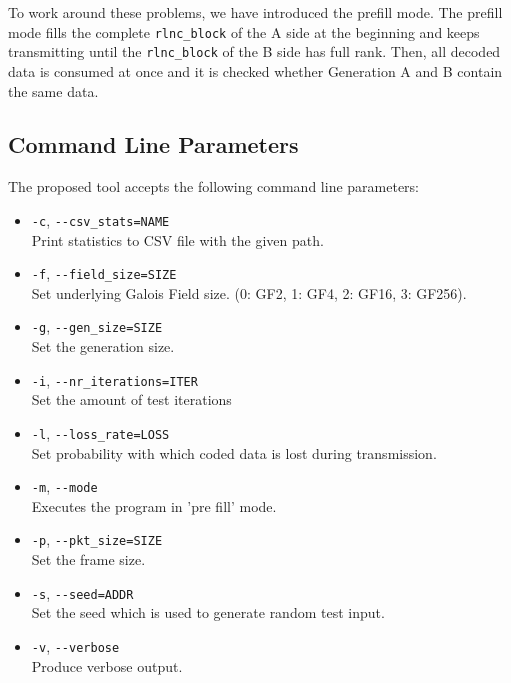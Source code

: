 \documentclass[a4paper,english,10pt]{tumarticle}
\begin{document}
To work around these problems, we have introduced the prefill mode. The prefill mode fills the
complete \texttt{rlnc\_block} of the A side at the beginning and keeps transmitting until the
\texttt{rlnc\_block} of the B side has full rank. Then, all decoded data is consumed at once and it
is checked whether Generation A and B contain the same data.

\subsection{Command Line Parameters}\label{app:cmd}
The proposed tool accepts the following command line parameters:

\begin{itemize}
    \item \texttt{-c}, \texttt{-{}-csv\_stats=NAME}\\
    Print statistics to CSV file with the given path.

    \item \texttt{-f}, \texttt{-{}-field\_size=SIZE}\\
    Set underlying Galois Field size. (0: GF2, 1: GF4, 2: GF16, 3: GF256).

    \item \texttt{-g}, \texttt{-{}-gen\_size=SIZE}\\
    Set the generation size.

    \item \texttt{-i}, \texttt{-{}-nr\_iterations=ITER}\\
    Set the amount of test iterations

    \item \texttt{-l}, \texttt{-{}-loss\_rate=LOSS}\\
    Set probability with which coded data is lost during transmission.

    \item \texttt{-m}, \texttt{-{}-mode}\\
    Executes the program in 'pre fill' mode.

    \item \texttt{-p}, \texttt{-{}-pkt\_size=SIZE}\\
    Set the frame size.

    \item \texttt{-s}, \texttt{-{}-seed=ADDR}\\
    Set the seed which is used to generate random test input.

    \item \texttt{-v}, \texttt{-{}-verbose}\\
    Produce verbose output.
\end{itemize}
\end{document}
